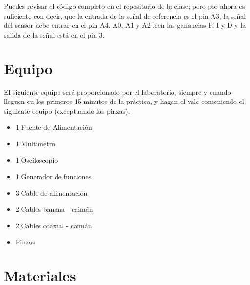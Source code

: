 		Puedes revisar el código completo en el repositorio de la clase; pero por ahora es suficiente con decir, que la entrada de la señal de referencia es el pin A3, la señal del sensor debe entrar en el pin A4. A0, A1 y A2 leen las ganancias P, I y D y la salida de la señal está en el pin 3.

\section{Equipo}

	El siguiente equipo será proporcionado por el laboratorio, siempre y cuando lleguen en los primeros 15 minutos de la práctica, y hagan el vale conteniendo el siguiente equipo (exceptuando las pinzas).

	\begin{itemize}
		\item 1 Fuente de Alimentación
		\item 1 Multímetro
		\item 1 Osciloscopio
		\item 1 Generador de funciones
		\item 3 Cable de alimentación
		\item 2 Cables banana - caimán
		\item 2 Cables coaxial - caimán
		\item Pinzas
	\end{itemize}


\section{Materiales}

